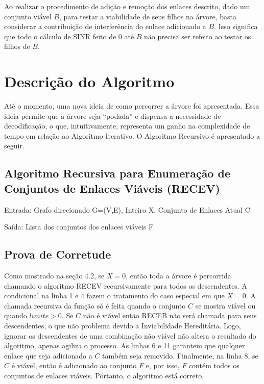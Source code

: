 Ao realizar o procedimento de adição e remoção dos enlaces descrito, dado um conjunto viável $B$, para testar a viabilidade de seus filhos na árvore, basta considerar a contribuição de interferência do enlace adicionado a $B$. Isso significa que todo o cálculo de SINR feito de 0 até $B$ não precisa ser refeito ao testar os filhos de $B$. 

\section{Descrição do Algoritmo}

Até o momento, uma nova ideia de como percorrer a árvore foi apresentada. Essa ideia permite que a árvore seja “podada” e dispensa a necessidade de decodificação, o que, intuitivamente, representa um ganho na complexidade de tempo em relação ao Algoritmo Iterativo. O Algoritmo Recursivo é apresentado a seguir.

\subsection{Algoritmo Recursiva para Enumeração de Conjuntos de Enlaces Viáveis (RECEV)}

Entrada: Grafo direcionado G=(V,E), Inteiro X, Conjunto de Enlaces Atual C

Saída: Lista dos conjuntos dos enlaces viáveis F


\subsection{Prova de Corretude}

Como mostrado na seção 4.2, se $X=0$, então toda a árvore é percorrida chamando o algoritmo RECEV recursivamente para todos os descendentes. A condicional na linha 1 e 4 fazem o tratamento do caso especial em que $X=0$. A chamada recursiva da função só é feita quando o conjunto $C$ se mostra viável ou quando $limite>0$. Se $C$ não é viável então RECEB não será chamada para seus descendentes, o que não problema devido a Inviabilidade Hereditária. Logo, ignorar os descendentes de uma combinação não viável não altera o resultado do algoritmo, apenas agiliza o processo. As linhas 6 e 11 garantem que qualquer enlace que seja adicionado a $C$ também seja removido. Finalmente, na linha 8, se $C$ é viável, então é adicionado ao conjunto $F$ e, por isso, $F$ contém todos os conjuntos de enlaces viáveis. Portanto, o algoritmo está correto.

